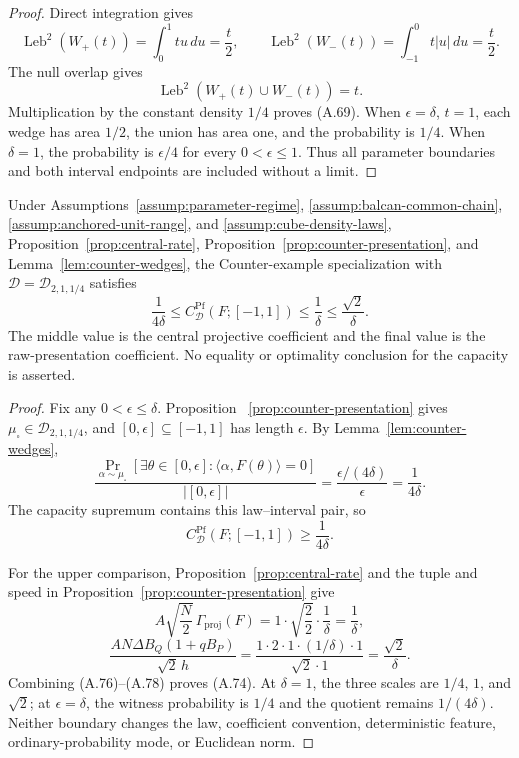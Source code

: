 \begin{proof}
Direct integration gives
\[
\operatorname{Leb}^2(W_+(t))=\int_0^1tu\,du=\frac t2,
\qquad
\operatorname{Leb}^2(W_-(t))=\int_{-1}^0t|u|\,du=\frac t2.
\]
The null overlap gives
\[
\operatorname{Leb}^2(W_+(t)\cup W_-(t))=t.
\tag{A.73}
\]
Multiplication by the constant density $1/4$ proves (A.69).
When $\epsilon=\delta$, $t=1$, each wedge has area $1/2$, the union has
area one, and the probability is $1/4$.  When $\delta=1$, the probability
is $\epsilon/4$ for every $0<\epsilon\leq1$.  Thus all parameter boundaries
and both interval endpoints are included without a limit.
\end{proof}

\begin{proposition}
\label{prop:counter-scale}
Under Assumptions~\ref{assump:parameter-regime},
\ref{assump:balcan-common-chain},
\ref{assump:anchored-unit-range}, and
\ref{assump:cube-density-laws}, Proposition~\ref{prop:central-rate},
Proposition~\ref{prop:counter-presentation}, and
Lemma~\ref{lem:counter-wedges}, the Counter-example specialization with
$\mathcal D=\mathcal D_{2,1,1/4}$ satisfies
\[
\frac1{4\delta}
\leq C^{\mathrm{Pf}}_{\mathcal D}(F;[-1,1])
\leq\frac1\delta
\leq\frac{\sqrt2}{\delta}.
\tag{A.74}
\]
The middle value is the central projective coefficient and the final value is
the raw-presentation coefficient.  No equality or optimality conclusion for
the capacity is asserted.
\end{proposition}

\begin{proof}
Fix any $0<\epsilon\leq\delta$.  Proposition
~\ref{prop:counter-presentation} gives
$\mu_\square\in\mathcal D_{2,1,1/4}$, and
$[0,\epsilon]\subseteq[-1,1]$ has length $\epsilon$.  By
Lemma~\ref{lem:counter-wedges},
\[
\frac{
\Pr_{\alpha\sim\mu_\square}
[\exists\theta\in[0,\epsilon]:
 \langle\alpha,F(\theta)\rangle=0]}
{|[0,\epsilon]|}
=\frac{\epsilon/(4\delta)}\epsilon
=\frac1{4\delta}.
\tag{A.75}
\]
The capacity supremum contains this law--interval pair, so
\[
C^{\mathrm{Pf}}_{\mathcal D}(F;[-1,1])
\geq\frac1{4\delta}.
\tag{A.76}
\]

For the upper comparison, Proposition~\ref{prop:central-rate} and the tuple
and speed in Proposition~\ref{prop:counter-presentation} give
\[
A\sqrt{\frac N2}\,\Gamma_{\mathrm{proj}}(F)
=1\cdot\sqrt{\frac22}\cdot\frac1\delta
=\frac1\delta,
\tag{A.77}
\]
\[
\frac{AN\Delta B_Q(1+qB_P)}{\sqrt2\,h}
=\frac{1\cdot2\cdot1\cdot(1/\delta)\cdot1}
       {\sqrt2\cdot1}
=\frac{\sqrt2}{\delta}.
\tag{A.78}
\]
Combining (A.76)--(A.78) proves (A.74).  At $\delta=1$, the three scales
are $1/4$, $1$, and $\sqrt2$; at $\epsilon=\delta$, the witness probability
is $1/4$ and the quotient remains $1/(4\delta)$.  Neither boundary changes
the law, coefficient convention, deterministic feature, ordinary-probability
mode, or Euclidean norm.
\end{proof}

